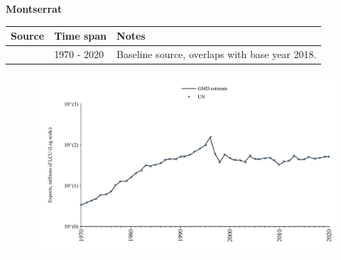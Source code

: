\documentclass[12pt,a4paper,landscape]{article}
\begin{document}
\begin{adjustbox}{max totalsize={\paperwidth}{\paperheight},center}
\begin{minipage}[t][\textheight][t]{\textwidth}
\vspace*{0.5cm}
{}
\begin{center}
{\Large\bfseries Montserrat}
\end{center}
\vspace{0.5cm}
\begin{table}[H]
\centering
\small
\begin{tabular}{|l|l|l|}
\hline
\textbf{Source} & \textbf{Time span} & \textbf{Notes} \\
\hline
\rowcolor{white}\cite{UN}& 1970 - 2020 &Baseline source, overlaps with base year 2018.\\
\hline
\end{tabular}
\end{table}
\begin{figure}[H]
\centering
\includegraphics[width=\textwidth,height=0.6\textheight,keepaspectratio]{graphs/MSR_exports.pdf}
\end{figure}
\end{minipage}
\end{adjustbox}
\end{document}
